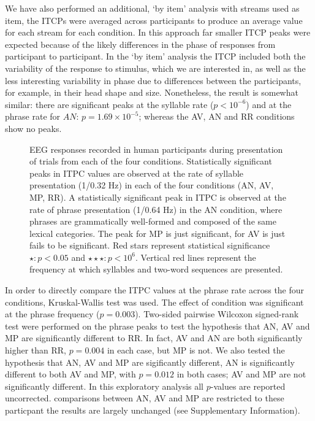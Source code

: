 \documentclass[10pt,letterpaper]{article}
\begin{document}
We have also performed an additional, `by item' analysis with streams
used as item, the ITCPs were averaged across participants to produce
an average value for each stream for each condition. In this approach
far smaller ITCP peaks were expected because of the likely differences
in the phase of responses from participant to participant. In the `by
item' analysis the ITCP included both the variability of the response
to stimulus, which we are interested in, as well as the less
interesting variability in phase due to differences between the
participants, for example, in their head shape and size. Nonetheless,
the result is somewhat similar: there are significant peaks at the
syllable rate ($p<10^{-6}$) and at the phrase rate for $AN$:
$p=1.69\times 10^{-5}$; whereas the AV, AN and RR conditions show no
peaks.

\begin{figure}[tbhp]

\caption{EEG responses recorded in human participants during
  presentation of trials from each of the four
  conditions. Statistically significant peaks in ITPC values are
  observed at the rate of syllable presentation (1/0.32 Hz) in each of
  the four conditions (AN, AV, MP, RR). A statistically significant
  peak in ITPC is observed at the rate of phrase presentation (1/0.64
  Hz) in the AN condition, where phrases are grammatically well-formed
  and composed of the same lexical categories. The peak for MP is just
  significant, for AV is just fails to be significant. Red stars
  represent statistical significance $\star: p<0.05$ and
  $\star\star\star: p<10^{6}$. Vertical red lines represent the
  frequency at which syllables and two-word sequences are presented.}
\label{fig:Fig2}
\end{figure}

In order to directly compare the ITPC values at the phrase rate across
the four conditions, Kruskal-Wallis test was used. The effect of
condition was significant at the phrase frequency
($p=0.003$). Two-sided pairwise Wilcoxon signed-rank test were
performed on the phrase peaks to test the hypothesis that AN, AV and
MP are significantly different to RR. In fact, AV and AN are both
significantly higher than RR, $p=0.004$ in each case, but MP is
not. We also tested the hypothesis that AN, AV and MP are sigificantly
different, AN is significantly different to both AV and MP, with
$p=0.012$ in both cases; AV and MP are not significantly different. In
this exploratory analysis all $p$-values are reported
uncorrected. comparisons between AN, AV and MP are restricted to these
particpant the results are largely unchanged (see Supplementary
Information).
\end{document}
